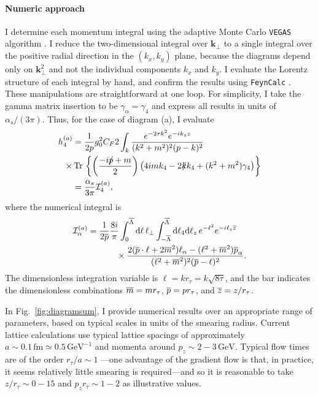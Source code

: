 \paragraph{Numeric approach} I determine each momentum integral using the adaptive Monte Carlo \verb+VEGAS+ algorithm \cite{Lepage:1977sw}. I reduce the two-dimensional integral over $\mathbf{k}_\perp$ to a single integral over the positive radial direction in the $(k_x,k_y)$ plane, because the diagrams depend only on $\mathbf{k}_\perp^2$ and not the individual components $k_x$ and $k_y$. I evaluate the Lorentz structure of each integral by hand, and confirm the results using \verb+FeynCalc+ \cite{Mertig:1990an,Shtabovenko:2016sxi}. These manipulations are straightforward at one loop. For simplicity, I take the gamma matrix insertion to be $\gamma_\alpha= \gamma_4$ and express all results in units of $\alpha_s/(3\pi)$. Thus, for the case of diagram (a), I evaluate
\begin{align}
h_4^{(a)} = {} & \frac{1}{2p}g_0^2C_F 2\int_k \frac{  e^{-2\tau k^2} e^{-ik_zz}}{(k^2+m^2)^2(p-k)^2} \nonumber \\
\times \operatorname{Tr} {} &\left\{ \left(\frac{-ip\!\!\!/+m}{2}\right)\left(4im k_4-2k\!\!\!/ k_4+ (k^2+m^2)\gamma_4 \right)\right\} \nonumber\\
= {} & \frac{\alpha_s}{3\pi} {\cal I}_4^{(a)},
\end{align}
where the numerical integral is
\begin{align}
{\cal I}_\alpha^{(a)} = {} & \frac{1}{2\overline{p}}\frac{8i}{\pi } \int_0^{\overline{\Lambda}} \mathrm{d}\ell\,\ell_\perp \int_{-\overline{\Lambda}}^{\overline{\Lambda}} \mathrm{d}\ell_4\mathrm{d}\ell_z \,e^{-\ell^2} e^{-i\ell_z\overline{z}} \nonumber \\
{} & \qquad \times \frac{2(\overline{p}\cdot \ell  +2\overline{m}^2)\ell_\alpha-(\ell^2+\overline{m}^2)\overline{p}_\alpha}{(\ell^2+\overline{m}^2)^2(\overline{p}-\ell)^2}.
\end{align}
The dimensionless integration variable is $\ell = kr_\tau = k\sqrt{8\tau}$, and the bar indicates the dimensionless combinations $\overline{m} = mr_\tau$, $\overline{p} = pr_\tau$, and $\overline{z} = z/r_\tau$.

In Fig.~\ref{fig:diagramsum}, I provide numerical results over an appropriate range of parameters, based on typical scales in units of the smearing radius. Current lattice calculations use typical lattice spacings of approximately $a\sim 0.1\,\mathrm{fm}\simeq 0.5\,\mathrm{GeV^{-1}}$ and momenta around $p_z \sim 2-3\,\mathrm{GeV}$. Typical flow times are of the order $r_\tau/a \sim 1$ \cite{Berkowitz:2017opd}---one advantage of the gradient flow is that, in practice, it seems relatively little smearing is required---and so it is reasonable to take $z/r_\tau \sim 0-15$ and $p_zr_\tau\sim 1-2$ as illustrative values.

